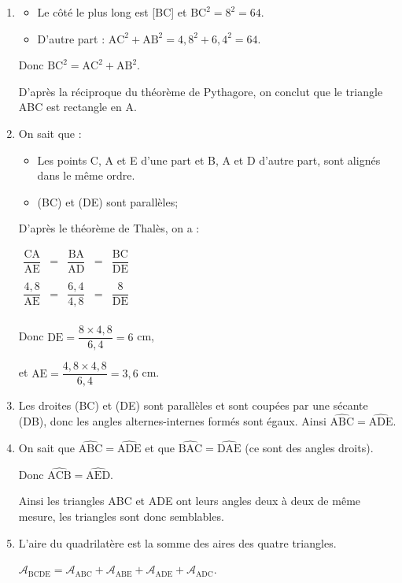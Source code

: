 \documentclass[12pt,a4paper,french]{article}
\begin{document}
\begin{enumerate}
	\item 	\begin{itemize}[label =$\bullet$]
				\item Le côté le plus long est [BC] et $\text{BC}^2=8^2=64$.
				\item D'autre part : $\text{AC}^2+\text{AB}^2=4,8^2+6,4^2=64$.
		\end{itemize}
		Donc $\text{BC}^2=\text{AC}^2+\text{AB}^2$.
		
		D'après la réciproque du théorème de Pythagore, on conclut que le triangle ABC est rectangle en A.
		\item On sait que : 
		\begin{itemize}[label =$\bullet$]
			\item Les points C, A et E d'une part et B, A et D d'autre part, sont alignés dans le même ordre. 
				\item (BC) et (DE) sont parallèles;
		\end{itemize}
		D'après le théorème de Thalès, on a :
		
		\(\begin{array}{ccccc}
		\dfrac{\text{CA}}{\text{AE}}&=&\dfrac{\text{BA}}{\text{AD}}&=&\dfrac{\text{BC}}{\text{DE}}\\
		 & & & & \\
		\dfrac{4,8}{\text{AE}}&=&\dfrac{6,4}{4,8}&=&\dfrac{8}{\text{DE}}\\
		\end{array}\)
		
		Donc $\text{DE}=\dfrac{8\times 4,8}{6,4}=6$ cm,
		
		et $\text{AE}=\dfrac{4,8\times 4,8}{6,4}=3,6$ cm.
		\item Les droites (BC) et (DE) sont parallèles et sont coupées par une sécante (DB), donc les angles alternes-internes formés sont égaux. Ainsi $\widehat{\text{ABC}}=\widehat{\text{ADE}}$.
		\item On sait que $\widehat{\text{ABC}}=\widehat{\text{ADE}}$ et que $\widehat{\text{BAC}}=\widehat{\text{DAE}}$ (ce sont des angles droits).
		
		Donc $\widehat{\text{ACB}}=\widehat{\text{AED}}$.
		
		Ainsi les triangles ABC et ADE ont leurs angles deux à deux de même mesure, les triangles sont donc semblables.
		\item
		L'aire du quadrilatère est la somme des aires des quatre triangles.
		
		 $\mathcal{A}_{\text{BCDE}}=\mathcal{A}_{\text{ABC}}+\mathcal{A}_{\text{ABE}}+\mathcal{A}_{\text{ADE}}+\mathcal{A}_{\text{ADC}}$.
		 

\end{enumerate}
\end{document}
